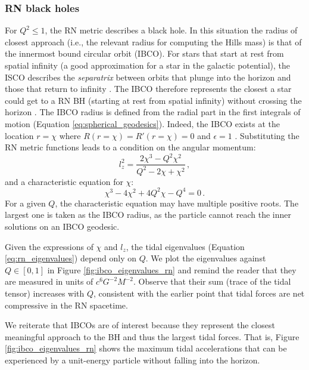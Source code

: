 \documentclass[
    reprint,
    prd,
    nofootinbib,
    amsmath,amssymb,
    aps,
    floatfix,
]{revtex4-2}
\begin{document}
\subsubsection{RN black holes} \label{sec:rn_ibco}


For $Q^2 \leq 1$, the RN metric describes a black hole. In this situation the radius of closest approach (i.e., the relevant radius for computing the Hills mass) is that of the innermost bound circular orbit (IBCO). For stars that start at rest from spatial infinity (a good approximation for a star in the galactic potential), the ISCO describes the \textit{separatrix} between orbits that plunge into the horizon and those that return to infinity \cite{Levin2008, MummeryBalbus2023PRD}. The IBCO therefore represents the closest a star could get to a RN BH (starting at rest from spatial infinity) without crossing the horizon \cite{Mummery2023}. The IBCO radius is defined from the radial part in the first integrals of motion (Equation \ref{eq:spherical_geodesics}). Indeed, the IBCO exists at the location $r=\chi$ where $R(r = \chi) = R'(r = \chi) = 0$ and $\epsilon = 1$ \cite{Levin2008, MummeryBalbus2023PRD}. Substituting the RN metric functions leads to a condition on the angular momentum:
\begin{equation}
    l_{z}^{2} = \frac{2\chi^{3} - Q^{2}\chi^{2}}{Q^{2} - 2\chi + \chi^{2}} \, ,
\end{equation}
and a characteristic equation for $\chi$:
\begin{equation}
    \chi^{3} - 4\chi^{2} + 4Q^{2}\chi - Q^{4} = 0 \, .
\end{equation}
For a given $Q$, the characteristic equation may have multiple positive roots. The largest one is taken as the IBCO radius, as the particle cannot reach the inner solutions on an IBCO geodesic.

Given the expressions of $\chi$ and $l_{z}$, the tidal eigenvalues (Equation \ref{eq:rn_eigenvalues}) depend only on $Q$. We plot the eigenvalues against $Q \in [0, 1]$ in Figure \ref{fig:ibco_eigenvalues_rn} and remind the reader that they are measured in units of $c^{6}G^{-2}M^{-2}$. Observe that their sum (trace of the tidal tensor) increases with $Q$, consistent with the earlier point that tidal forces are net compressive in the RN spacetime.

We reiterate that IBCOs are of interest because they represent the closest meaningful approach to the BH and thus the largest tidal forces. That is, Figure \ref{fig:ibco_eigenvalues_rn} shows the maximum tidal accelerations that can be experienced by a unit-energy particle without falling into the horizon.
\end{document}
